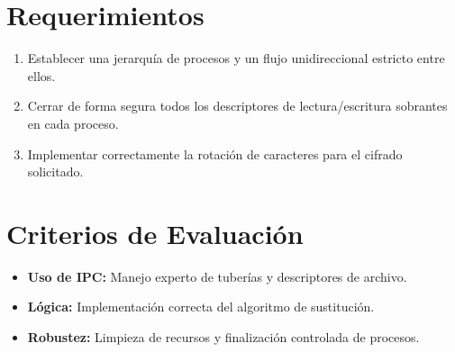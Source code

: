 \documentclass[12pt,a4paper]{article}
\begin{document}
\section*{Requerimientos}
\begin{enumerate}
    \item Establecer una jerarquía de procesos y un flujo unidireccional estricto entre ellos.
    \item Cerrar de forma segura todos los descriptores de lectura/escritura sobrantes en cada proceso.
    \item Implementar correctamente la rotación de caracteres para el cifrado solicitado.
\end{enumerate}

\section*{Criterios de Evaluación}
\begin{itemize}
    \item \textbf{Uso de IPC:} Manejo experto de tuberías y descriptores de archivo.
    \item \textbf{Lógica:} Implementación correcta del algoritmo de sustitución.
    \item \textbf{Robustez:} Limpieza de recursos y finalización controlada de procesos.
\end{itemize}
\end{document}
